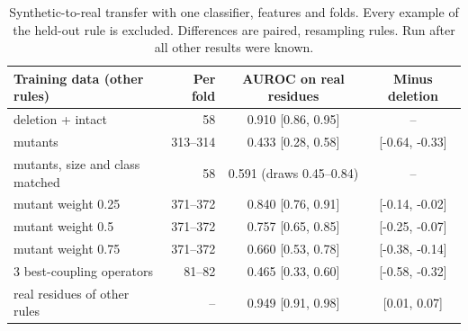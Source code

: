 \begin{table}[t]
\centering\small\setlength{\tabcolsep}{4pt}
\caption{Synthetic-to-real transfer with one classifier, features and folds. Every example of the held-out rule is excluded. Differences are paired, resampling rules. Run after all other results were known.}\label{tab:transfer}
\begin{tabular}{lrcc}
\toprule
Training data (other rules) & Per fold & AUROC on real residues & Minus deletion \\
\midrule
deletion + intact & 58 & 0.910 [0.86, 0.95] & -- \\
mutants & 313--314 & 0.433 [0.28, 0.58] & [-0.64, -0.33] \\
mutants, size and class matched & 58 & 0.591 (draws 0.45--0.84) & -- \\
mutant weight 0.25 & 371--372 & 0.840 [0.76, 0.91] & [-0.14, -0.02] \\
mutant weight 0.5 & 371--372 & 0.757 [0.65, 0.85] & [-0.25, -0.07] \\
mutant weight 0.75 & 371--372 & 0.660 [0.53, 0.78] & [-0.38, -0.14] \\
3 best-coupling operators & 81--82 & 0.465 [0.33, 0.60] & [-0.58, -0.32] \\
real residues of other rules & -- & 0.949 [0.91, 0.98] & [0.01, 0.07] \\
\bottomrule
\end{tabular}
\end{table}
